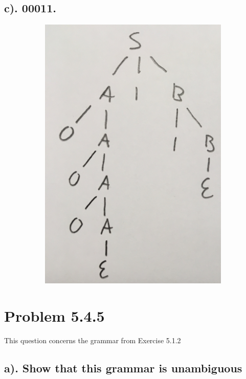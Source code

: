 \documentclass[20pt]{article} %
\begin{document}
\subsection{c). 00011.}
\begin{figure}[!htbp]
  	\centering
   	\begin{subfigure}[p]{0.4\linewidth}
    	\includegraphics[width=\linewidth]{./figures/h6-3.jpg}
   	\end{subfigure}
\end{figure} 

\section{Problem 5.4.5}
This question concerns the grammar from Exercise 5.1.2
\subsection{a). Show that this grammar is unambiguous}
\end{document}
